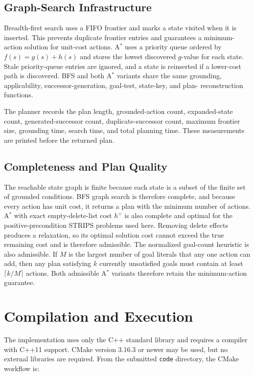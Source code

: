 \subsection{Graph-Search Infrastructure}

Breadth-first search uses a FIFO frontier and marks a state visited when it is
inserted.  This prevents duplicate frontier entries and guarantees a
minimum-action solution for unit-cost actions.  A$^\ast$ uses a priority queue
ordered by $f(s)=g(s)+h(s)$ and stores the lowest discovered $g$-value for each
state.  Stale priority-queue entries are ignored, and a state is reinserted if a
lower-cost path is discovered.  BFS and both A$^\ast$ variants share the same
grounding, applicability, successor-generation, goal-test, state-key, and plan-
reconstruction functions.

The planner records the plan length, grounded-action count, expanded-state
count, generated-successor count, duplicate-successor count, maximum frontier
size, grounding time, search time, and total planning time.  These measurements
are printed before the returned plan.

\subsection{Completeness and Plan Quality}

The reachable state graph is finite because each state is a subset of the
finite set of grounded conditions.  BFS graph search is therefore complete, and
because every action has unit cost, it returns a plan with the minimum number of
actions.  A$^\ast$ with exact empty-delete-list cost $h^+$ is also complete and
optimal for the positive-precondition STRIPS problems used here.  Removing
delete effects produces a relaxation, so its optimal solution cost cannot
exceed the true remaining cost and is therefore admissible.  The normalized
goal-count heuristic is also admissible.  If $M$ is the largest number of goal
literals that any one action can add, then any plan satisfying $k$ currently
unsatisfied goals must contain at least $\lceil k/M \rceil$ actions.  Both
admissible A$^\ast$ variants therefore retain the minimum-action guarantee.

\section{Compilation and Execution}
\label{sec:compilation}

The implementation uses only the C++ standard library and requires a compiler
with C++11 support.  CMake version 3.16.3 or newer may be used, but no external
libraries are required.  From the submitted \texttt{code} directory, the CMake
workflow is:

